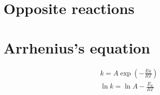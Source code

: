 \documentclass[../Master.tex]{subfiles}
\begin{document}
\begin{multicols*}{2}
		 \section{Opposite reactions}

		 \section{Arrhenius's equation}
		  \begin{gather*}
				   k = A \exp \left( -\frac{Ea}{RT} \right)\\
				   \ln k = \ln A - \frac{E_{a}}{RT}
		  \end{gather*}
\end{multicols*}
\end{document}
